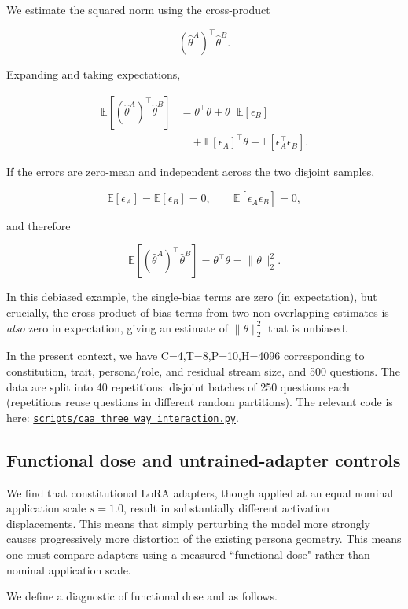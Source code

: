 \documentclass{article}
\newcommand{\provbase}{https://github.com/ukc10014/steering_across_personas/blob/6343a8cee28aaf713b9658b3ab207cb8fb377e51}
\DeclareRobustCommand{\provlink}[1]{\href{\provbase/#1}{\nolinkurl{#1}}}
\begin{document}
We estimate the squared norm using the cross-product

\[
\left(\hat{\theta}^{A}\right)^\top
\hat{\theta}^{B}.
\]

Expanding and taking expectations,

\[
\begin{aligned}
\mathbb{E}\left[
\left(\hat{\theta}^{A}\right)^\top
\hat{\theta}^{B}
\right]
&=
\theta^\top\theta
+ \theta^\top\mathbb{E}[\epsilon_B]\\
&\quad+ \mathbb{E}[\epsilon_A]^\top\theta
+ \mathbb{E}\left[\epsilon_A^\top\epsilon_B\right].
\end{aligned}
\]

If the errors are zero-mean and independent across the two disjoint
samples,

\[
\mathbb{E}[\epsilon_A]
=
\mathbb{E}[\epsilon_B]
=
0,
\qquad
\mathbb{E}\left[\epsilon_A^\top\epsilon_B\right]
=
0,
\]

and therefore

\[
\mathbb{E}\left[
\left(\hat{\theta}^{A}\right)^\top
\hat{\theta}^{B}
\right]
=
\theta^\top\theta
=
\|\theta\|_2^2.
\]

In this debiased example, the single-bias terms are zero (in expectation), but crucially, the cross product of bias terms from two non-overlapping estimates is \textit{also} zero in expectation, giving an estimate of $\|\theta\|_2^2$ that is unbiased.

In the present context, we have C=4,T=8,P=10,H=4096 corresponding to constitution, trait, persona/role, and residual stream size, and 500 questions. The data are split into 40 repetitions: disjoint batches of 250 questions each (repetitions reuse questions in different random partitions). The relevant code is here: \provlink{scripts/caa_three_way_interaction.py}.


\subsection{Functional dose and untrained-adapter controls}
\label{app:f-dose}
We find that constitutional LoRA adapters, though applied at an equal nominal application scale $s=1.0$, result in substantially different activation displacements. This means that simply perturbing the model more strongly causes progressively more distortion of the existing persona geometry. This means one must compare adapters using a measured ``functional dose" rather than nominal application scale.

We define a diagnostic of functional dose and as follows. 
\end{document}
